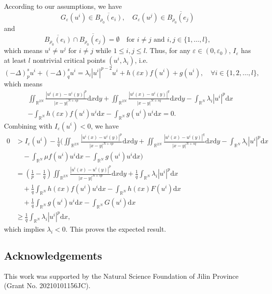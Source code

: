 \documentclass[reqno]{amsart}
\begin{document}
According to our assumptions, we have
$$
G_\varepsilon(u^{i})\in\overline{B_{\rho_{0}}(e_i)},\quad 
G_\varepsilon(u^{j})\in\overline{B_{\rho_{0}}(e_j)}
$$
and
$$
\overline{B_{\rho_{0}}(e_i)}\cap\overline{B_{\rho_{0}}(e_j)}=\emptyset \quad 
\text{for }  i\neq j  \text{ and }i,j\in{\{1,\dots,l\}},
$$
which means $u^{i}\neq u^{j}$ for $i \neq  j$ while $1 \le i, j \le l$.
Thus, for any $\varepsilon\in(0,\varepsilon_0)$, $I_\varepsilon$ has at least 
$l$ nontrivial critical points $(u^{i},\lambda_i)$, i.e.
$$
(-\Delta)_p^{s} u^{i}+(-\Delta)_q^{s} u^{i}=\lambda_i |u^{i}|^{p-2}u^{i}
+h(\varepsilon x)f(u^{i})+g(u^{i}),\quad \forall i\in\{1,2,\dots,l\},
$$
which means
\begin{align*}
&\iint_{\mathbb{R}^{2N}}\frac{|u^{i}(x)-u^{i}(y)|^{p}}{|x-y|^{N+sp}}\mathrm{d}x\mathrm{d}y+\iint_{\mathbb{R}^{2N}}\frac{|u^{i}(x)-u^{i}(y)|^{q}}{|x-y|^{N+sq}}\mathrm{d}x\mathrm{d}y-\int_{\mathbb{R}^N}\lambda_{i} |u^{i}|^{p}\mathrm{d}x\\
&-\int_{\mathbb{R}^N}h(\varepsilon x) f(u^{i})u^{i}\mathrm{d}x-\int_{\mathbb{R}^N} g(u^{i})u^{i}\mathrm{d}x=0.
\end{align*}
Combining with $I_\varepsilon(u^{i})<0$, we have
\begin{align*}
0&>I_\varepsilon(u^{i})-\frac{1}{q}(\iint_{\mathbb{R}^{2N}}\frac{|u^{i}(x)
 -u^{i}(y)|^{p}}{|x-y|^{N+sp}}\mathrm{d}x\mathrm{d}y
 +\iint_{\mathbb{R}^{2N}}\frac{|u^{i}(x)-u^{i}(y)|^{q}}{|x-y|^{N+sq}}
 \mathrm{d}x\mathrm{d}y-\int_{\mathbb{R}^N}\lambda_{i} |u^{i}|^{p}\mathrm{d}x\\
&\quad -\int_{\mathbb{R}^N}\mu f(u^{i})u^{i}\mathrm{d}x
 -\int_{\mathbb{R}^N} g(u^{i})u^{i}\mathrm{d}x)\\
&= (\frac{1}{p}-\frac{1}{q})\iint_{\mathbb{R}^{2N}}\frac{|u^{i}(x)-u^{i}(y)|^{p}}
 {|x-y|^{N+sp}}\mathrm{d}x\mathrm{d}y
 +\frac{1}{q}\int_{\mathbb{R}^N}\lambda_i |{u^{i}}|^{p}\mathrm{d}x\\
&\quad +\frac{1}{q}\int_{\mathbb{R}^N}h(\varepsilon x)
 f(u^{i})u^{i}\mathrm{d}x-\int_{\mathbb{R}^N}h(\varepsilon x)  F(u^{i})\mathrm{d}x\\
&\quad +\frac{1}{q}\int_{\mathbb{R}^N} g(u^{i})u^{i}\mathrm{d}x
 -\int_{\mathbb{R}^N} G(u^{i})\mathrm{d}x\\
&\geq \frac{1}{q}\int_{\mathbb{R}^N}\lambda_i |{u^{i}}|^{p}\mathrm{d}x,
\end{align*}
which implies $\lambda_i<0$. This proves the expected result.

\subsection*{Acknowledgements}
This work was supported by the Natural Science Foundation of Jilin Province 
(Grant No. 20210101156JC).
\end{document}
